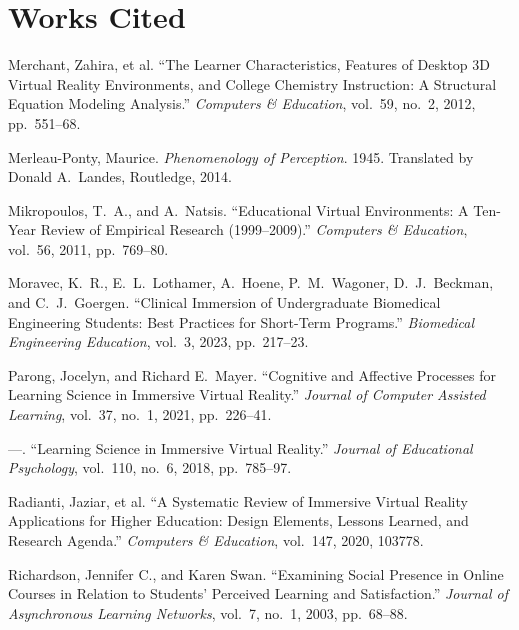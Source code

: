 \documentclass{article}
\newenvironment{workscited}
  {\section*{Works Cited}\begin{list}{}
    {\setlength{\itemindent}{-0.5in}\setlength{\leftmargin}{0.5in}
     \setlength{\itemsep}{0pt}\setlength{\parsep}{6pt}}}
  {\end{list}}
\begin{document}
\begin{workscited}
\item Merchant, Zahira, et al. ``The Learner Characteristics, Features of
Desktop 3D Virtual Reality Environments, and College Chemistry
Instruction: A Structural Equation Modeling Analysis.''
\textit{Computers \& Education}, vol.~59, no.~2, 2012, pp.~551--68.

\item Merleau-Ponty, Maurice. \textit{Phenomenology of Perception}. 1945.
Translated by Donald A.\ Landes, Routledge, 2014.

\item Mikropoulos, T.\ A., and A.\ Natsis. ``Educational Virtual
Environments: A Ten-Year Review of Empirical Research (1999--2009).''
\textit{Computers \& Education}, vol.~56, 2011, pp.~769--80.

\item Moravec, K.\ R., E.\ L.\ Lothamer, A.\ Hoene, P.\ M.\ Wagoner,
D.\ J.\ Beckman, and C.\ J.\ Goergen. ``Clinical Immersion of
Undergraduate Biomedical Engineering Students: Best Practices for
Short-Term Programs.'' \textit{Biomedical Engineering Education},
vol.~3, 2023, pp.~217--23. %

\item Parong, Jocelyn, and Richard E.\ Mayer. ``Cognitive and Affective
Processes for Learning Science in Immersive Virtual Reality.''
\textit{Journal of Computer Assisted Learning}, vol.~37, no.~1, 2021,
pp.~226--41. %

\item ---. ``Learning Science in Immersive Virtual Reality.''
\textit{Journal of Educational Psychology}, vol.~110, no.~6, 2018,
pp.~785--97.

\item Radianti, Jaziar, et al. ``A Systematic Review of Immersive Virtual
Reality Applications for Higher Education: Design Elements, Lessons
Learned, and Research Agenda.'' \textit{Computers \& Education},
vol.~147, 2020, 103778. %

\item Richardson, Jennifer C., and Karen Swan. ``Examining Social
Presence in Online Courses in Relation to Students' Perceived Learning
and Satisfaction.'' \textit{Journal of Asynchronous Learning Networks},
vol.~7, no.~1, 2003, pp.~68--88. %


\end{workscited}
\end{document}
